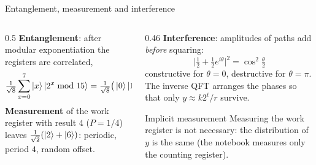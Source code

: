 \documentclass[aspectratio=169,11pt]{beamer}
\newcommand{\key}[1]{{\color{qdark}\textbf{#1}}}
\begin{document}
\begin{frame}[label=fEntangle]{Entanglement, measurement and interference}
  \begin{columns}[T]
    \begin{column}{0.5\textwidth}
      \small
      \key{Entanglement}: after modular exponentiation the registers are correlated,
      \[ \tfrac{1}{\sqrt8}\sum_{x=0}^{7}\ket x\ket{2^x \bmod 15} = \tfrac{1}{\sqrt8}\big(\ket0\ket1 + \ket1\ket2 + \ket2\ket4 + \dots\big) \]
      \key{Measurement} of the work register with result $4$ ($P = 1/4$) leaves $\frac{1}{\sqrt2}(\ket2 + \ket6)$: periodic, period $4$, random offset.
    \end{column}
    \begin{column}{0.46\textwidth}
      \key{Interference}: amplitudes of paths add \emph{before} squaring:
      \[ \big|\tfrac12 + \tfrac12e^{i\theta}\big|^2 = \cos^2\tfrac\theta2 \]
      \small constructive for $\theta = 0$, destructive for $\theta = \pi$. The inverse QFT arranges the phases so that only $y \approx k2^t/r$ survive.
      \begin{block}{Implicit measurement}
        \scriptsize Measuring the work register is not necessary: the distribution of $y$ is the same (the notebook measures only the counting register).
      \end{block}
    \end{column}
  \end{columns}
\end{frame}

\end{document}

